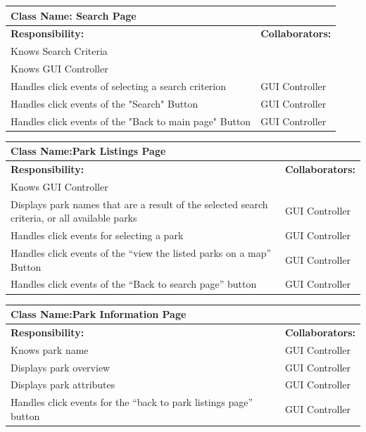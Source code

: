 \documentclass[titlepage,12pt]{article}
\begin{document}
    
 \begin{table}[H]
 	\centering
 	\begin{tabular}{|p{5cm}|p{5cm}|}
 		\hline 
 		\multicolumn{2}{|l|}{\textbf{Class Name: Search Page}} \\
 		\hline
 		\textbf{Responsibility:} & \textbf{Collaborators:} \\
 		\hline
	 	Knows Search Criteria & \\ 
	 	\hline
	 	Knows GUI Controller &\\
 		\hline
 		Handles click events of selecting a search criterion	&	GUI Controller\\
 		\hline
 		Handles click events of the "Search" Button		&	GUI Controller\\
 		\hline
 		Handles click events of the "Back to main page" Button	&	GUI Controller\\
 		\hline        \end{tabular}
 \end{table}
 	\begin{table}[H]
 		\centering
 		\begin{tabular}{|p{5cm}|p{5cm}|}
 			\hline 
 			\multicolumn{2}{|l|}{\textbf{Class Name:Park Listings Page}} \\
 			\hline
 			\textbf{Responsibility:} & \textbf{Collaborators:} \\
 			\hline
 			Knows GUI Controller & \\
 			\hline
 			Displays park names that are a result of the selected search criteria, or all available parks	&		GUI Controller\\
 			\hline
 			Handles click events for selecting a park 			&	GUI Controller\\
 			\hline
 			Handles click events of the “view the listed parks on a map” Button	& GUI Controller\\
 			\hline
 			Handles click events of the “Back to search page” button		& GUI Controller\\
 			\hline
 			
 		\end{tabular}
 		
 		
 		
 	\end{table}
 	
 		\begin{table}[H]
 			\centering
 			\begin{tabular}{|p{5cm}|p{5cm}|}
 				\hline 
 				\multicolumn{2}{|l|}{\textbf{Class Name:Park Information Page}} \\
 				\hline
 				\textbf{Responsibility:} & \textbf{Collaborators:} \\
 				\hline
 				Knows park name		&	GUI Controller\\
 				\hline
 				Displays park overview			& GUI Controller	\\
 				\hline
 				Displays park attributes		& GUI Controller \\
 				\hline
 				Handles click events for the “back to park listings page” button	&	GUI Controller\\
 				\hline
 			\end{tabular}
 		\end{table}
 		
\end{document}
